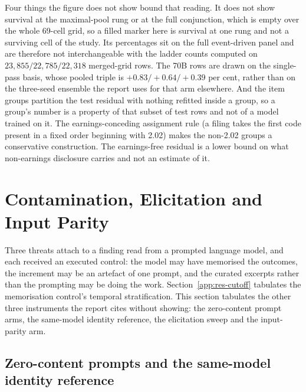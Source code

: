 Four things the figure does not show bound that reading. It does not show
survival at the maximal-pool rung or at the full conjunction, which is empty
over the whole 69-cell grid, so a filled marker here is survival at one rung
and not a surviving cell of the study. Its percentages sit on the full
event-driven panel and are therefore not interchangeable with the ladder
counts computed on $23{,}855/22{,}785/22{,}318$ merged-grid rows. The 70B rows
are drawn on the single-pass basis, whose pooled triple is
$+0.83/+0.64/+0.39$ per cent, rather than on the three-seed ensemble the
report uses for that arm elsewhere. %
And the item groups partition the test residual with nothing refitted inside a
group, so a group's number is a property of that subset of test rows and not
of a model trained on it. The earnings-conceding assignment rule (a filing
takes the first code present in a fixed order beginning with 2.02) makes
the non-2.02 groups a conservative construction. The earnings-free residual
is a lower bound on what non-earnings disclosure carries and not an estimate
of it.

\FloatBarrier
\section{Contamination, Elicitation and Input Parity}
\label{app:res-probes}

Three threats attach to a finding read from a prompted language model, and
each received an executed control: the model may have memorised the
outcomes, the increment may be an artefact of one prompt, and the curated
excerpts rather than the prompting may be doing the work.
Section~\ref{app:res-cutoff} tabulates the memorisation control's temporal
stratification. This section tabulates the other three instruments the
report cites without showing: the zero-content prompt arms, the same-model
identity reference, the elicitation sweep and the input-parity arm.

\subsection{Zero-content prompts and the same-model identity reference}

